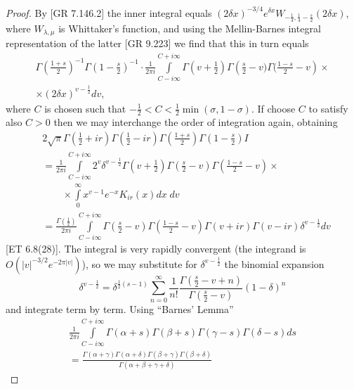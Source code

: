 \begin{proof}
By [GR 7.146.2] the inner integral equals $(2 \delta x)^{-3/4} e^{\delta x} W_{-\frac{1}{4}, \frac{1}{4} -\frac{s}{2}} (2 \delta x)$, where $W_{\lambda, \mu}$  is Whittaker's function, and using the Mellin-Barnes integral representation of the latter [GR 9.223] we find that this in turn equals 
\begin{gather*}
\Gamma \left(\frac{1+s}{2} \right)^{-1} \Gamma \left(1-\frac{s}{2} \right)^{-1} \cdot \frac{1}{2 \pi i} \int\limits^{C + i \infty}_{C - i \infty} \Gamma \left(v+ \frac{1}{2}\right) \Gamma \left(\frac{s}{2}-v) \Gamma (\frac{1-s}{2} -v\right) \times \\
\times (2\delta x)^{v - \frac{1}{2}} d v, 
\end{gather*}\pageoriginale
where $C$ is chosen such that $-\frac{1}{2} < C < \frac{1}{2} \min (\sigma, 1 -\sigma)$. If choose $C$ to satisfy also $C>0$ then we may interchange the order of integration again, obtaining
\begin{align*}
& 2 \sqrt{\pi} \Gamma \left(\frac{1}{2} + ir\right) \Gamma (\frac{1}{2} -ir) \Gamma \left(\frac{1+s}{2} \right) \Gamma \left(1-\frac{s}{2} \right) I\\
&  =\frac{1}{2 \pi i} \int\limits^{C+ i \infty}_{C -  i \infty} 2^v \delta^{v -\frac{1}{2}} \Gamma (v + \frac{1}{2}) \Gamma \left(\frac{s}{2} -v \right) \Gamma \left(\frac{1-s}{2} - v \right) \times \\
& \qquad \times \int\limits^\infty_{0} x^{v-1} e^{-x} K_{ir} (x) dx \; d v\\
& =\frac{\Gamma (\frac{1}{2})}{2 \pi i} \int\limits^{C + i \infty}_{C - i \infty} \Gamma \left(\frac{s}{2} -v \right) \Gamma \left(\frac{1-s}{2} -v \right) \Gamma (v+ ir) \Gamma (v - ir) \delta^{v -\frac{1}{2}} dv 
\end{align*}
[ET 6.8(28)]. The integral is very rapidly convergent (the integrand is $O(|v|^{-3/2} e^{-2 \pi|v|})$), so we may substitute for $\delta^{v -\frac{1}{2}}$ the binomial expansion
$$
\delta^{v -\frac{1}{2}} =\delta^{\frac{1}{2} (s-1)} \sum\limits^\infty_{n=0} \frac{1}{n!}  \frac{\Gamma \left(\frac{s}{2} - v + n \right)}{\Gamma \left(\frac{s}{2} -v \right)} (1-\delta)^n
$$
and integrate term by term. Using ``Barnes' Lemma''
\begin{gather*}
\frac{1}{2 \pi i} \int\limits^{C + i \infty}_{C - i \infty} \Gamma (\alpha +s) \Gamma (\beta +s) \Gamma (\gamma -s) \Gamma (\delta -s) ds\\
= \frac{\Gamma (\alpha + \gamma) \Gamma (\alpha + \delta) \Gamma (\beta + \gamma) \Gamma (\beta + \delta)}{\Gamma (\alpha + \beta + \gamma + \delta)}

\end{gather*}
\end{proof}
